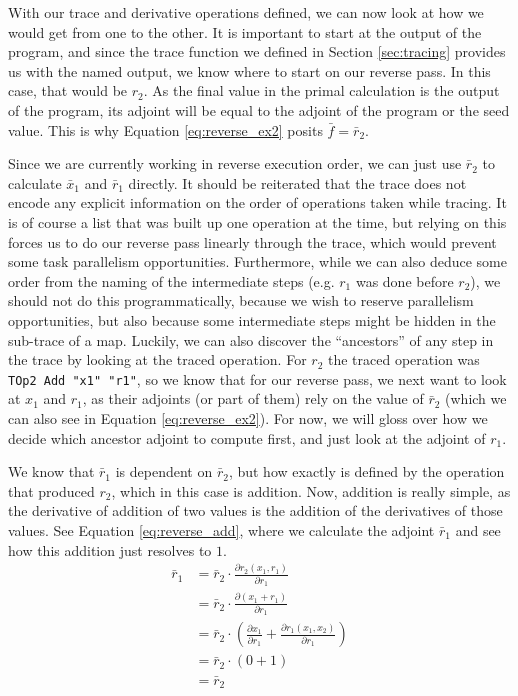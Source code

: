     With our trace and derivative operations defined, we can now look at how we would get from one to the other.
    It is important to start at the output of the program, and since the trace function we defined in Section \ref{sec:tracing} provides us with the named output, we know where to start on our reverse pass.
    In this case, that would be $r_2$.
    As the final value in the primal calculation is the output of the program, its adjoint will be equal to the adjoint of the program or the seed value.
    This is why Equation \ref{eq:reverse_ex2} posits $\bar{f}=\bar{r}_2$.

    Since we are currently working in reverse execution order, we can just use $\bar{r}_2$ to calculate $\bar{x}_1$ and $\bar{r}_1$ directly.
    It should be reiterated that the trace does not encode any explicit information on the order of operations taken while tracing.
    It is of course a list that was built up one operation at the time, but relying on this forces us to do our reverse pass linearly through the trace, which would prevent some task parallelism opportunities.
    Furthermore, while we can also deduce some order from the naming of the intermediate steps (e.g. $r_1$ was done before $r_2$), we should not do this programmatically, because we wish to reserve parallelism opportunities, but also because some intermediate steps might be hidden in the sub-trace of a map.
    Luckily, we can also discover the ``ancestors'' of any step in the trace by looking at the traced operation.
    For $r_2$ the traced operation was \texttt{TOp2 Add "x1" "r1"}, so we know that for our reverse pass, we next want to look at $x_1$ and $r_1$, as their adjoints (or part of them) rely on the value of $\bar{r}_2$ (which we can also see in Equation \ref{eq:reverse_ex2}).
    For now, we will gloss over how we decide which ancestor adjoint to compute first, and just look at the adjoint of $r_1$.
    
    We know that $\bar{r}_1$ is dependent on $\bar{r}_2$, but how exactly is defined by the operation that produced $r_2$, which in this case is addition.
    Now, addition is really simple, as the derivative of addition of two values is the addition of the derivatives of those values.
    See Equation \ref{eq:reverse_add}, where we calculate the adjoint $\bar{r}_1$ and see how this addition just resolves to $1$.
    \begin{equation} \label{eq:reverse_add}
        \begin{aligned}
            \bar{r}_1&=\bar{r}_2\cdot\frac{\partial r_2(x_1, r_1)}{\partial r_1}\\
            &=\bar{r}_2\cdot\frac{\partial(x_1+r_1)}{\partial r_1}\\
            &=\bar{r}_2\cdot\left(\frac{\partial x_1}{\partial r_1}+\frac{\partial r_1(x_1,x_2)}{\partial r_1}\right)\\
            &=\bar{r}_2\cdot(0+1)\\
            &=\bar{r}_2
        \end{aligned}
    \end{equation}

